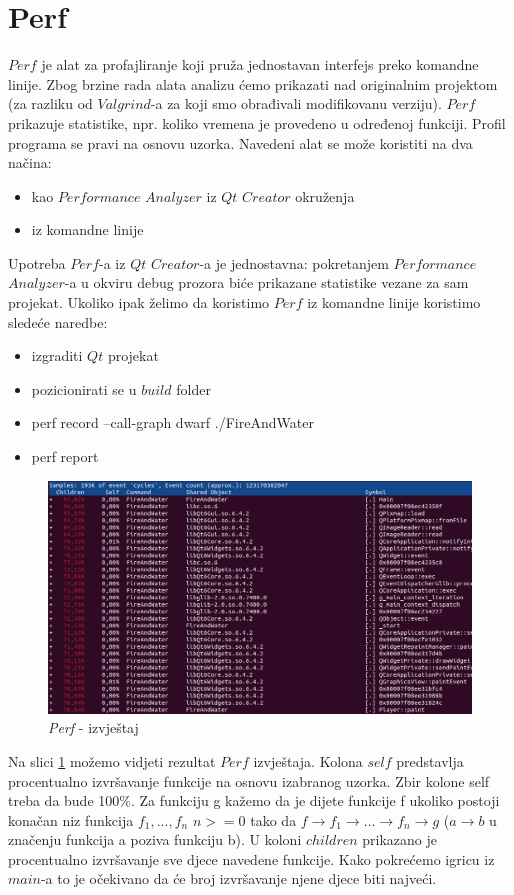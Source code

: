 \documentclass[a4paper]{article}
\begin{document}
\section{Perf}
	$Perf$ je alat za profajliranje koji pruža jednostavan interfejs preko komandne linije. Zbog brzine rada alata analizu ćemo prikazati nad originalnim projektom (za razliku od $Valgrind$-a za koji smo obrađivali modifikovanu verziju). $Perf$ prikazuje statistike, npr. koliko vremena je provedeno u određenoj funkciji. Profil programa se pravi na osnovu uzorka.
Navedeni alat se može koristiti na dva načina:
\begin{itemize}
	\item kao $Performance$ $Analyzer$ iz $Qt$ $Creator$ okruženja
	\item iz komandne linije
\end{itemize}
Upotreba $Perf$-a iz $Qt$ $Creator$-a je jednostavna: pokretanjem $Performance$ $Analyzer$-a u okviru debug prozora biće prikazane statistike vezane za sam projekat. Ukoliko ipak želimo da koristimo $Perf$ iz komandne linije koristimo sledeće naredbe:
\begin{itemize}
	\item izgraditi $Qt$ projekat
	\item pozicionirati se u $build$ folder
	\item perf record --call-graph dwarf ./FireAndWater
	\item perf report
\end{itemize}

	\begin{figure}[h!]
		\caption{\textit{Perf} - izvještaj}
		\label{fig:p1}
		\includegraphics[scale=0.5]{../Perf/p1.png}
	\end{figure}
	
	Na slici \ref{fig:p1} možemo vidjeti rezultat $Perf$ izvještaja. Kolona $self$ predstavlja procentualno izvršavanje funkcije na osnovu izabranog uzorka. Zbir kolone self treba da bude 100\%. Za funkciju g kažemo da je dijete funkcije f ukoliko postoji konačan niz funkcija $f_1,...,f_n$ $n>=0$ tako da $f \rightarrow f_1\rightarrow...\rightarrow f_n\rightarrow g$ ($a \rightarrow b$ u značenju funkcija a poziva funkciju b). U koloni $children$ prikazano je procentualno izvršavanje sve djece navedene funkcije. Kako pokrećemo igricu iz $main$-a to je očekivano da će broj izvršavanje njene djece biti najveći. 
	
\end{document}
